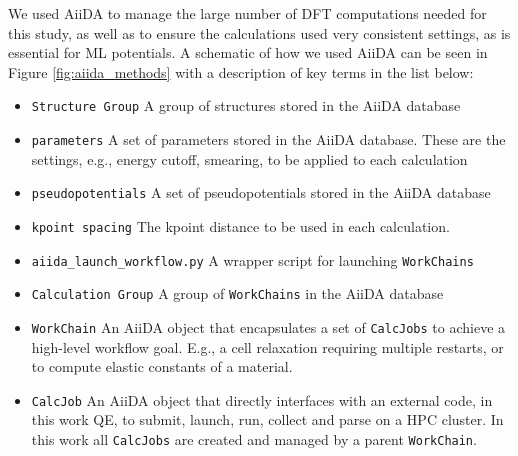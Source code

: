 \documentclass{article}
\begin{document}
We used AiiDA\cite{Pizzi2016, Huber2020AiiDAProvenance} to manage the large number of DFT computations needed for this study, as well as to ensure the calculations used very consistent settings, as is essential for ML potentials\cite{Dragoni2018AchievingIron}.
A schematic of how we used AiiDA can be seen in Figure \ref{fig:aiida_methods} with a description of key terms in the list below:
\begin{itemize}
    \item \texttt{Structure Group}  A group of structures stored in the AiiDA database
    \item \texttt{parameters}  A set of parameters stored in the AiiDA database. These are the settings, e.g., energy cutoff, smearing, to be applied to each calculation
    \item \texttt{pseudopotentials}  A set of pseudopotentials stored in the AiiDA database 
    \item \texttt{kpoint spacing}  The kpoint distance to be used in each calculation. 
    \item \texttt{aiida_launch_workflow.py}  A wrapper script for launching \texttt{WorkChains} 
    \item \texttt{Calculation Group}  A group of \texttt{WorkChains} in the AiiDA database 
    \item \texttt{WorkChain}  An AiiDA object that encapsulates a set of \texttt{CalcJobs} to 
                                          achieve a high-level workflow goal. E.g., a cell relaxation requiring 
                                          multiple restarts, or to compute elastic constants of a material. 
    \item \texttt{CalcJob}    An AiiDA object that directly interfaces with an external code, 
                                          in this work QE, to submit, launch, run, collect and parse on a HPC 
                                          cluster. In this work all \texttt{CalcJobs} are created and
                                          managed by a parent \texttt{WorkChain}.
\end{itemize}
\end{document}
